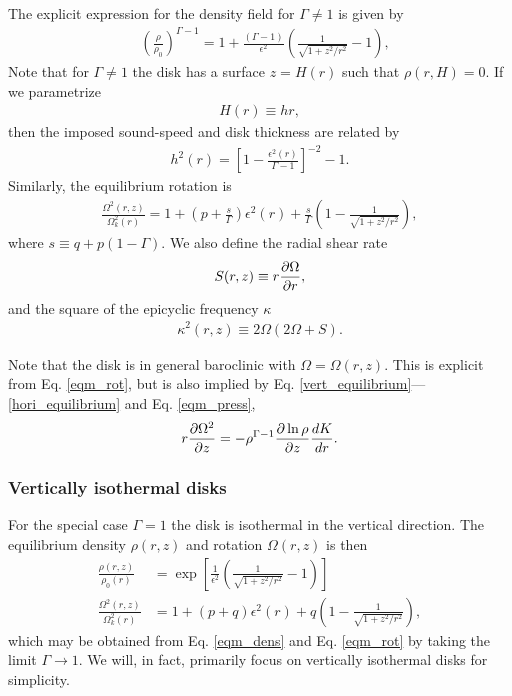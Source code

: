 The explicit expression for the density field for
$\Gamma\neq1$ is given  by
\begin{align}\label{eqm_dens}
  &\left(\frac{\rho}{\rho_0}\right)^{\Gamma-1} = 1 +
  \frac{\left(\Gamma-1\right)}{\epsilon^2}\left(\frac{1}{\sqrt{1+z^2/r^2}}-1\right),
\end{align}
Note that for $\Gamma\neq1$ the disk has a surface $z=H(r)$ such that
$\rho(r,H)=0$. If we parametrize
\begin{align}
  H(r)\equiv h r,
\end{align}
then the imposed sound-speed and disk thickness are related by 
\begin{align}
  h^2(r) = \left[1-\frac{\epsilon^2(r)}{\Gamma-1}\right]^{-2}-1. 
\end{align}
Similarly, the equilibrium rotation is 
\begin{align}\label{eqm_rot}
  \frac{\Omega^2(r,z)}{\Omega_k^2(r)}=1 +
  \left(p+\frac{s}{\Gamma}\right)\epsilon^2(r) 
  +\frac{s}{\Gamma} \left(1-\frac{1}{\sqrt{1+z^2/r^2}}\right), 
\end{align}
where $s\equiv q+p(1-\Gamma)$. We also define the radial shear rate  
\begin{align}
  S(r,z) \equiv r\frac{\partial\Omega}{\partial r},  
\end{align}
and the square of the epicyclic frequency $\kappa$ 
\begin{align}
  \kappa^2(r,z) \equiv 2\Omega(2\Omega + S). 
\end{align}

Note that the disk is in general baroclinic with $\Omega =
\Omega(r,z)$. This is explicit from Eq. \ref{eqm_rot}, but is also
implied by Eq. \ref{vert_equilibrium}---\ref{hori_equilibrium} and 
Eq. \ref{eqm_press},  
\begin{align}
  r\frac{\partial\Omega^2}{\partial z} = - \rho^{\Gamma-1}\frac{\partial\ln\rho}{\partial
    z}\frac{dK}{dr}.\label{vertical_shear}
\end{align}

\subsubsection{Vertically isothermal disks}
For the special case $\Gamma=1$ the disk is isothermal in the
vertical direction. The equilibrium density $\rho(r,z)$ and rotation
$\Omega(r,z)$ is then 
\begin{align}
  \frac{\rho(r,z)}{\rho_0(r)} &=
  \exp{\left[\frac{1}{\epsilon^2}\left(\frac{1}{\sqrt{1+z^2/r^2}}-1\right)\right]}\\    
  \frac{\Omega^2(r,z)}{\Omega_k^2(r)}& =1+ (p+q)\epsilon^2(r) + q\left(1 -
    \frac{1}{\sqrt{1+z^2/r^2}}\right),\label{vertiso_eqm}
\end{align}
which may be obtained from Eq. \ref{eqm_dens} and Eq. \ref{eqm_rot} by
taking the limit $\Gamma\to 1$. We will, in fact, primarily focus on
vertically isothermal disks for simplicity. 


